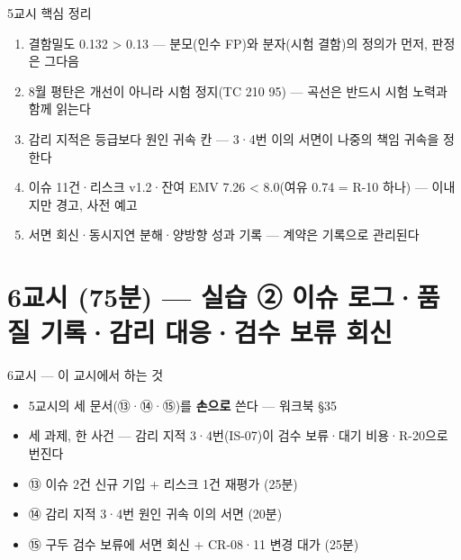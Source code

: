 \begin{frame}{5교시 핵심 정리}
\begin{enumerate}
\item 결함밀도 0.132 > 0.13 — 분모(인수 FP)와 분자(시험 결함)의 정의가 먼저, 판정은 그다음
\item 8월 평탄은 개선이 아니라 시험 정지(TC 210 \ra{} 95) — 곡선은 반드시 시험 노력과 함께 읽는다
\item 감리 지적은 등급보다 원인 귀속 칸 — 3·4번 이의 서면이 나중의 책임 귀속을 정한다
\item 이슈 11건·리스크 v1.2·잔여 EMV 7.26 < 8.0(여유 0.74 = R-10 하나) — 이내지만 경고, 사전 예고
\item 서면 회신·동시지연 분해·양방향 성과 기록 — 계약은 기록으로 관리된다
\end{enumerate}
\end{frame}

\section{6교시 (75분) — 실습 ② 이슈 로그·품질 기록·감리 대응·검수 보류 회신}

\begin{frame}{6교시 — 이 교시에서 하는 것}
\begin{itemize}
\item 5교시의 세 문서(⑬·⑭·⑮)를 \textbf{손으로} 쓴다 — 워크북 §3\til{}5
\item 세 과제, 한 사건 — 감리 지적 3·4번(IS-07)이 검수 보류·대기 비용·R-20으로 번진다
\item ⑬ 이슈 2건 신규 기입 + 리스크 1건 재평가 (25분)
\item ⑭ 감리 지적 3·4번 원인 귀속 이의 서면 (20분)
\item ⑮ 구두 검수 보류에 서면 회신 + CR-08·11 변경 대가 (25분)
\end{itemize}
\end{frame}

